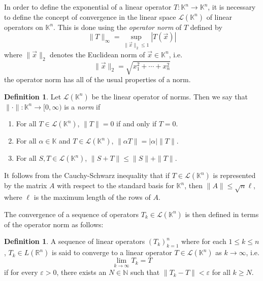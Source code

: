 \documentclass[11pt]{book}
\theoremstyle{definition}\newtheorem{definition}[subsection]{Definition}
\theoremstyle{definition}\newtheorem{example}[subsection]{Example}
\theoremstyle{definition}\newtheorem{notation}[subsection]{Notation}
\theoremstyle{definition}\newtheorem{remark}[subsection]{Remark}
\theoremstyle{theorem}\newtheorem{theorem}[subsection]{Theorem}
\theoremstyle{theorem}\newtheorem{lemma}[subsection]{Lemma}
\theoremstyle{theorem}\newtheorem{proposition}[subsection]{Proposition}
\theoremstyle{theorem}\newtheorem{corollary}[subsection]{Corollary}
\theoremstyle{theorem}\newtheorem{case}{Case}
\theoremstyle{remark}\newtheorem{subcase}{Subcase}[case]
\newcommand{\K}{\mathbb{K}}
\newcommand{\R}{\mathbb{R}}
\newcommand{\N}{\mathbb{N}}
\renewcommand{\L}{\mathscr{L}}
\newcommand{\e}{\varepsilon}
\begin{document}
In order to define the exponential of a linear operator $T : \K^n \to \K^n$, it is necessary to define the concept of convergence in the linear space $\L(\K^n)$ of linear operators on $\K^n$. This is done using the \emph{operator norm} of $T$ defined by
\begin{equation*}
    \|T\|_{\infty} = \sup_{\|\vec{x}\|_2 \leq 1} |T(\vec{x})|
\end{equation*}
where $\|\vec{x}\|_2$ denotes the Euclidean norm of $\vec{x} \in \K^n$, i.e.
\begin{equation*}
    \|\vec{x}\|_2 = \sqrt{x_1^2 + \cdots + x_n^2}
\end{equation*}
the operator norm has all of the usual properties of a norm.

\begin{definition}\label{definition:1.4.1}
    Let $\L(\K^n)$ be the linear operator of norms. Then we say that $\|\cdot\| : \K^n \to [0, \infty)$ is a \emph{norm} if
    \begin{enumerate}
        \item For all $T \in \L(\K^n)$, $\|T\| = 0$ if and only if $T = 0$.
        \item For all $\alpha \in \K$ and $T \in \L(\K^n)$, $\|\alpha T\| = |\alpha|\|T\|$.
        \item For all $S, T \in \L(\K^n)$, $\|S + T\| \leq \|S\| + \|T\|$.
    \end{enumerate}
\end{definition}

It follows from the Cauchy-Schwarz inequality that if $T \in \L(\K^n)$ is represented by the matrix $A$ with respect to the standard basis for $\K^n$, then $\|A\| \leq \sqrt{n}\ell$, where $\ell$ is the maximum length of the rows of $A$.

The convergence of a sequence of operators $T_k \in \L(\K^n)$ is then defined in terms of the operator norm as follows:

\begin{definition}\label{definition:1.4.2}
    A sequence of linear operators $(T_k)_{k = 1}^{n}$ where for each $1 \leq k \leq n$, $T_k \in L(\R^n)$ is said to converge to a linear operator $T \in \L(\K^n)$ as $k \to \infty$, i.e.
    \begin{equation*}
        \lim_{k \to \infty} T_k = T
    \end{equation*}
    if for every $\e > 0$, there exists an $N \in \N$ such that $\|T_k - T\| < \e$ for all $k \geq N$.
\end{definition}
\end{document}
